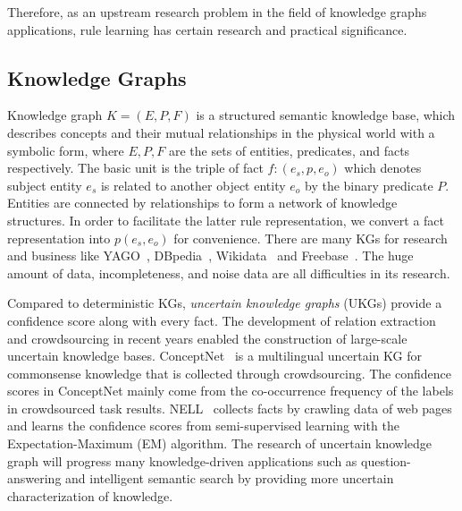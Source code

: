 \documentclass{article}
\begin{document}
	Therefore, as an upstream research problem in the field of knowledge graphs applications, rule learning has certain research and practical significance.
	
	\subsection{Knowledge Graphs}
	Knowledge graph $K = (E, P , F)$ is a structured semantic knowledge base, which describes concepts and their mutual relationships in the physical world with a symbolic form, where $E, P, F$ are the  sets of entities, predicates, and facts respectively. The basic unit is the triple of fact $f: (e_s, p, e_o)$ which denotes subject entity $e_s$ is related to another object entity $e_o$ by the binary predicate $P$. Entities are connected by relationships to form a network of knowledge structures. In order to facilitate the latter rule representation, we convert a fact representation into $p(e_s, e_o)$ for convenience. 
	There are many KGs for research and business like YAGO~\cite{Yago}, DBpedia~\cite{Dbpedia}, Wikidata~\cite{Wikidata} and Freebase~\cite{Freebase}.
	The huge amount of data, incompleteness, and noise data are all difficulties in its research.
	 
	Compared to deterministic KGs, {\em uncertain knowledge graphs} (UKGs) provide a confidence score along with every fact. The development of relation extraction and crowdsourcing in recent years enabled the construction of large-scale uncertain knowledge bases. 
	ConceptNet~\cite{Conceptnet} is a multilingual uncertain KG for commonsense knowledge that is collected through crowdsourcing. The confidence scores in ConceptNet mainly come from the co-occurrence frequency of the labels in crowdsourced task results. 
	NELL~\cite{NELL} collects facts by crawling data of web pages and learns the confidence scores from semi-supervised learning with the Expectation-Maximum (EM) algorithm. 
	The research of uncertain knowledge graph will progress many knowledge-driven applications such as question-answering and intelligent semantic search by providing more uncertain characterization of knowledge.
	
\end{document}

